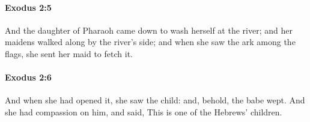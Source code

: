 		\paragraph{Exodus 2:5} %
			\label{EXODUS-2-5}

			And the daughter of Pharaoh came down to wash herself at the river; and her maidens walked along by the river's side; and when she saw the ark among the flags, she sent her maid to fetch it.


		\paragraph{Exodus 2:6} %
			\label{EXODUS-2-6}

			And when she had opened it, she saw the child: and, behold, the babe wept. And she had compassion on him, and said, This is one of the Hebrews' children.


